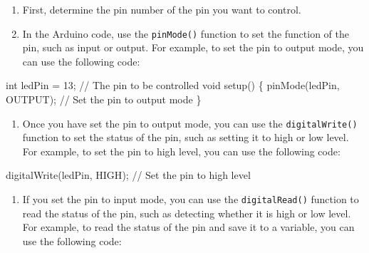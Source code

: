 \documentclass[
  letterpaper,
  DIV=11,
  numbers=noendperiod]{scrreprt}
\newenvironment{Shaded}{\begin{snugshade}}{\end{snugshade}}
\newcommand{\CommentTok}[1]{\textcolor[rgb]{0.37,0.37,0.37}{#1}}
\newcommand{\DataTypeTok}[1]{\textcolor[rgb]{0.68,0.00,0.00}{#1}}
\newcommand{\DecValTok}[1]{\textcolor[rgb]{0.68,0.00,0.00}{#1}}
\newcommand{\NormalTok}[1]{\textcolor[rgb]{0.00,0.23,0.31}{#1}}
\newcommand{\OperatorTok}[1]{\textcolor[rgb]{0.37,0.37,0.37}{#1}}
\providecommand{\tightlist}{%
  \setlength{\itemsep}{0pt}\setlength{\parskip}{0pt}}\usepackage{longtable,booktabs,array}
\begin{document}
\begin{enumerate}
\def\labelenumi{\arabic{enumi}.}
\tightlist
\item
  First, determine the pin number of the pin you want to control.
\item
  In the Arduino code, use the \texttt{pinMode()} function to set the
  function of the pin, such as input or output. For example, to set the
  pin to output mode, you can use the following code:
\end{enumerate}

\begin{Shaded}
\begin{Highlighting}[]
\DataTypeTok{int}\NormalTok{ ledPin }\OperatorTok{=} \DecValTok{13}\OperatorTok{;} \CommentTok{// The pin to be controlled}
\DataTypeTok{void}\NormalTok{ setup}\OperatorTok{()} \OperatorTok{\{}
\NormalTok{    pinMode}\OperatorTok{(}\NormalTok{ledPin}\OperatorTok{,}\NormalTok{ OUTPUT}\OperatorTok{);} \CommentTok{// Set the pin to output mode}
\OperatorTok{\}}
\end{Highlighting}
\end{Shaded}

\begin{enumerate}
\def\labelenumi{\arabic{enumi}.}
\setcounter{enumi}{2}
\tightlist
\item
  Once you have set the pin to output mode, you can use the
  \texttt{digitalWrite()} function to set the status of the pin, such as
  setting it to high or low level. For example, to set the pin to high
  level, you can use the following code:
\end{enumerate}

\begin{Shaded}
\begin{Highlighting}[]
\NormalTok{digitalWrite}\OperatorTok{(}\NormalTok{ledPin}\OperatorTok{,}\NormalTok{ HIGH}\OperatorTok{);} \CommentTok{// Set the pin to high level}
\end{Highlighting}
\end{Shaded}

\begin{enumerate}
\def\labelenumi{\arabic{enumi}.}
\setcounter{enumi}{3}
\tightlist
\item
  If you set the pin to input mode, you can use the
  \texttt{digitalRead()} function to read the status of the pin, such as
  detecting whether it is high or low level. For example, to read the
  status of the pin and save it to a variable, you can use the following
  code:
\end{enumerate}
\end{document}
